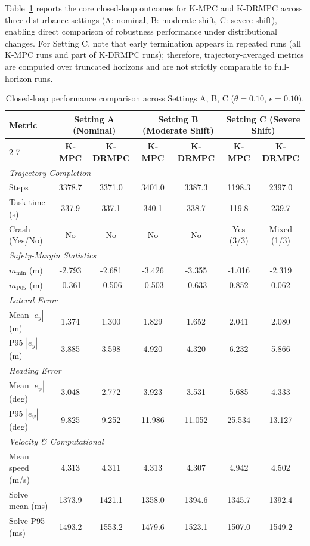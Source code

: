\documentclass[pdflatex,sn-mathphys,Numbered]{sn-jnl}
\numberwithin{equation}{section}
\begin{document}
	Table~\ref{tab:main_results} reports the core closed-loop outcomes for K-MPC and K-DRMPC across three disturbance settings (A: nominal, B: moderate shift, C: severe shift), enabling direct comparison of robustness performance under distributional changes.
	For Setting C, note that early termination appears in repeated runs (all K-MPC runs and part of K-DRMPC runs); therefore, trajectory-averaged metrics are computed over truncated horizons and are not strictly comparable to full-horizon runs.
	
	\begin{table}[htbp]
		\centering
		\caption{Closed-loop performance comparison across Settings A, B, C ($\theta=0.10$, $\epsilon=0.10$).}
		\label{tab:main_results}
		\scriptsize
		\setlength{\tabcolsep}{2.5pt}
		\begin{tabular*}{\textwidth}{@{\extracolsep{\fill}}p{2.8cm}|c c|c c|c c}
			\toprule
			\multirow{2}{*}{\textbf{Metric}} & \multicolumn{2}{c|}{\textbf{Setting A (Nominal)}} & \multicolumn{2}{c|}{\textbf{Setting B (Moderate Shift)}} & \multicolumn{2}{c}{\textbf{Setting C (Severe Shift)}} \\
			\cmidrule{2-7}
			& \textbf{K-MPC} & \textbf{K-DRMPC} & \textbf{K-MPC} & \textbf{K-DRMPC} & \textbf{K-MPC} & \textbf{K-DRMPC} \\
			\midrule
			\multicolumn{7}{l}{\textit{Trajectory Completion}} \\
			Steps & 3378.7 & 3371.0 & 3401.0 & 3387.3 & 1198.3 & 2397.0 \\
			Task time (s) & 337.9 & 337.1 & 340.1 & 338.7 & 119.8 & 239.7 \\
			Crash (Yes/No) & No & No & No & No & Yes (3/3) & Mixed (1/3) \\
			\midrule
			\multicolumn{7}{l}{\textit{Safety-Margin Statistics}} \\
			$m_{\min}$ (m) & -2.793 & -2.681 & -3.426 & -3.355 & -1.016 & -2.319 \\
			$m_{\mathrm{P05}}$ (m) & -0.361 & -0.506 & -0.503 & -0.633 & 0.852 & 0.062 \\
			\midrule
			\multicolumn{7}{l}{\textit{Lateral Error}} \\
			Mean $|e_y|$ (m) & 1.374 & 1.300 & 1.829 & 1.652 & 2.041 & 2.080 \\
			P95 $|e_y|$ (m) & 3.885 & 3.598 & 4.920 & 4.320 & 6.232 & 5.866 \\
			\midrule
			\multicolumn{7}{l}{\textit{Heading Error}} \\
			Mean $|e_\psi|$ (deg) & 3.048 & 2.772 & 3.923 & 3.531 & 5.685 & 4.333 \\
			P95 $|e_\psi|$ (deg) & 9.825 & 9.252 & 11.986 & 11.052 & 25.534 & 13.127 \\
			\midrule
			\multicolumn{7}{l}{\textit{Velocity \& Computational}} \\
			Mean speed (m/s) & 4.313 & 4.311 & 4.313 & 4.307 & 4.942 & 4.502 \\
			Solve mean (ms) & 1373.9 & 1421.1 & 1358.0 & 1394.6 & 1345.7 & 1392.4 \\
			Solve P95 (ms) & 1493.2 & 1553.2 & 1479.6 & 1523.1 & 1507.0 & 1549.2 \\
			\bottomrule
		\end{tabular*}
	\end{table}
	
\end{document}
